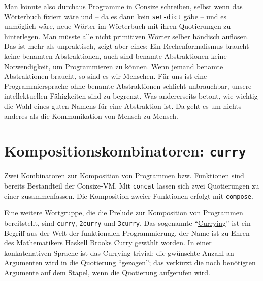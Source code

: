 

Man könnte also durchaus Programme in Consize schreiben, selbst wenn das Wörterbuch fixiert wäre und -- da es dann kein \verb|set-dict| gäbe -- und es unmöglich wäre, neue Wörter im Wörterbuch mit ihren Quotierungen zu hinterlegen. Man müsste alle nicht primitiven Wörter selber händisch auflösen. Das ist mehr als unpraktisch, zeigt aber eines: Ein Rechenformalismus braucht keine benamten Abstraktionen, auch sind benamte Abstraktionen keine Notwendigkeit, um Programmieren zu können. Wenn jemand benamte Abstraktionen braucht, so sind es wir Menschen. Für uns ist eine Programmiersprache ohne benamte Abstraktionen schlicht unbrauchbar, unsere intellektuellen Fähigkeiten sind zu begrenzt. Was andererseits betont, wie wichtig die Wahl eines guten Namens für eine Abstraktion ist. Da geht es um nichts anderes als die Kommunikation von Mensch zu Mensch.

\section{Kompositionskombinatoren: \texttt{curry}}

Zwei Kombinatoren zur Komposition von Programmen bzw. Funktionen sind bereits Bestandteil der Consize-VM. Mit \verb|concat| lassen sich zwei Quotierungen zu einer zusammenfassen. Die Komposition zweier Funktionen erfolgt mit \verb|compose|.


Eine weitere Wortgruppe, die die Prelude zur Komposition von Programmen bereitstellt, sind \verb|curry|, \verb|2curry| und \verb|3curry|. Das sogenannte "`\href{http://de.wikipedia.org/wiki/Currying}{Currying}"' ist ein Begriff aus der Welt der funktionalen Programmierung, der Name ist zu Ehren des Mathematikers \href{http://de.wikipedia.org/wiki/Haskell_Brooks_Curry}{Haskell Brooks Curry} gewählt worden. In einer konkatenativen Sprache ist das Currying trivial: die gwünschte Anzahl an Argumenten wird in die Quotierung "`gezogen"'; das verkürzt die noch benötigten Argumente auf dem Stapel, wenn die Quotierung aufgerufen wird.

